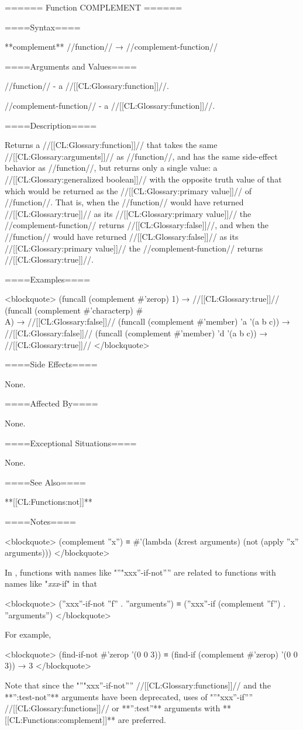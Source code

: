====== Function COMPLEMENT ======

====Syntax====

**complement** //function// → //complement-function//

====Arguments and Values====

//function// - a //[[CL:Glossary:function]]//.

//complement-function// - a //[[CL:Glossary:function]]//.

====Description====

Returns a //[[CL:Glossary:function]]// that takes the same //[[CL:Glossary:arguments]]// as //function//, and has the same side-effect behavior as //function//, but returns only a single value: a //[[CL:Glossary:generalized boolean]]// with the opposite truth value of that which would be returned as the //[[CL:Glossary:primary value]]// of //function//. That is, when the //function// would have returned //[[CL:Glossary:true]]// as its //[[CL:Glossary:primary value]]// the //complement-function// returns //[[CL:Glossary:false]]//, and when the //function// would have returned //[[CL:Glossary:false]]// as its //[[CL:Glossary:primary value]]// the //complement-function// returns //[[CL:Glossary:true]]//.

====Examples====

<blockquote> (funcall (complement #'zerop) 1) → //[[CL:Glossary:true]]// (funcall (complement #'characterp) #\\A) → //[[CL:Glossary:false]]// (funcall (complement #'member) 'a '(a b c)) → //[[CL:Glossary:false]]// (funcall (complement #'member) 'd '(a b c)) → //[[CL:Glossary:true]]// </blockquote>

====Side Effects====

None.

====Affected By====

None.

====Exceptional Situations====

None.

====See Also====

**[[CL:Functions:not]]**

====Notes====

<blockquote> (complement ''x'') ≡ #'(lambda (&rest arguments) (not (apply ''x'' arguments))) </blockquote>

In \clisp, functions with names like "''"xxx''-if-not'''' are related to functions with names like "\f{{\it xxx}-if}" in that

<blockquote> (''xxx''-if-not ''f'' . ''arguments'') ≡ (''xxx''-if (complement ''f'') . ''arguments'') </blockquote>

For example,

<blockquote> (find-if-not #'zerop '(0 0 3)) ≡ (find-if (complement #'zerop) '(0 0 3)) → 3 </blockquote>

Note that since the "''"xxx''-if-not'''' //[[CL:Glossary:functions]]// and the **'':test-not''** arguments have been deprecated, uses of "''"xxx''-if'''' //[[CL:Glossary:functions]]// or **'':test''** arguments with **[[CL:Functions:complement]]** are preferred.



